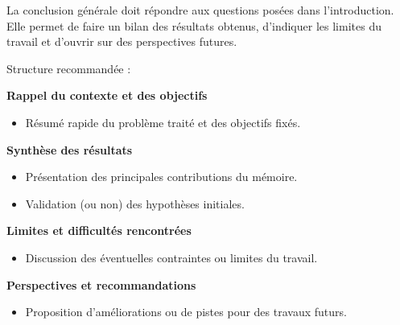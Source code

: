 \ConclusionGenerale

La conclusion générale doit répondre aux questions posées dans l’introduction. Elle permet de faire un bilan des résultats obtenus, d’indiquer les limites du travail et d’ouvrir sur des perspectives futures.

Structure recommandée :

\textbf{Rappel du contexte et des objectifs}
\begin{itemize}
	\item Résumé rapide du problème traité et des objectifs fixés.
\end{itemize}

\textbf{Synthèse des résultats}

\begin{itemize}
	\item Présentation des principales contributions du mémoire.
	\item Validation (ou non) des hypothèses initiales.
\end{itemize}

\textbf{Limites et difficultés rencontrées}

\begin{itemize}
	\item Discussion des éventuelles contraintes ou limites du travail.
\end{itemize}

\textbf{Perspectives et recommandations}

\begin{itemize}
	\item Proposition d’améliorations ou de pistes pour des travaux futurs. 
\end{itemize}